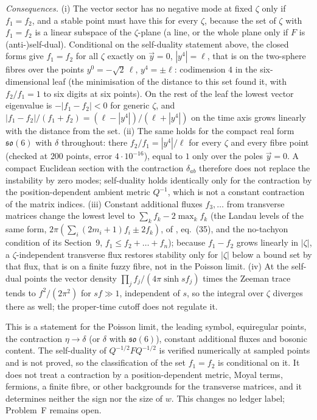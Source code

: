 \emph{Consequences.} (i) The vector sector has no negative mode at fixed \(\zeta\) only if \(f_1=f_2\), and a stable point must have this for every \(\zeta\), because the set of \(\zeta\) with \(f_1=f_2\) is a linear subspace of the \(\zeta\)-plane (a line, or the whole plane only if \(F\) is (anti-)self-dual). Conditional on the self-duality statement above, the closed forms give \(f_1=f_2\) for all \(\zeta\) exactly on \(\vec y=0\), \(|y^4|=\ell\), that is on the two-sphere fibres over the points \(y^0=-\sqrt2\,\ell\), \(y^4=\pm\ell\): codimension \(4\) in the six-dimensional leaf (the minimisation of the distance to this set found it, with \(f_2/f_1=1\) to six digits at six points). On the rest of the leaf the lowest vector eigenvalue is \(-|f_1-f_2|<0\) for generic \(\zeta\), and \(|f_1-f_2|/(f_1+f_2)=(\ell-|y^4|)/(\ell+|y^4|)\) on the time axis grows linearly with the distance from the set. (ii) The same holds for the compact real form \(\mathfrak{so}(6)\) with \(\delta\) throughout: there \(f_2/f_1=|y^4|/\ell\) for every \(\zeta\) and every fibre point (checked at \(200\) points, error \(4\cdot10^{-16}\)), equal to \(1\) only over the poles \(\vec y=0\). A compact Euclidean section with the contraction \(\delta_{ab}\) therefore does not replace the instability by zero modes; self-duality holds identically only for the contraction by the position-dependent ambient metric \(Q^{-1}\), which is not a constant contraction of the matrix indices. (iii) Constant additional fluxes \(f_3,\dots\) from transverse matrices change the lowest level to \(\sum_kf_k-2\max_kf_k\) (the Landau levels of the same form, \(2\pi(\sum_i(2m_i+1)f_i\pm2f_k)\), of \cite{Troost2000}, eq.~(35), and the no-tachyon condition of its Section~9, \(f_1\le f_2+\dots+f_n\)); because \(f_1-f_2\) grows linearly in \(|\zeta|\), a \(\zeta\)-independent transverse flux restores stability only for \(|\zeta|\) below a bound set by that flux, that is on a finite fuzzy fibre, not in the Poisson limit. (iv) At the self-dual points the vector density \(\prod_j f_j/(4\pi\sinh sf_j)\) times the Zeeman trace tends to \(f^2/(2\pi^2)\) for \(sf\gg1\), independent of \(s\), so the integral over \(\zeta\) diverges there as well; the proper-time cutoff does not regulate it.



This is a statement for the Poisson limit, the leading symbol, equiregular points, the contraction \(\eta\to\delta\) (or \(\delta\) with \(\mathfrak{so}(6)\)), constant additional fluxes and bosonic content. The self-duality of \(Q^{-1/2}FQ^{-1/2}\) is verified numerically at sampled points and is not proved, so the classification of the set \(f_1=f_2\) is conditional on it. It does not treat a contraction by a position-dependent metric, Moyal terms, fermions, a finite fibre, or other backgrounds for the transverse matrices, and it determines neither the sign nor the size of \(w\). This changes no ledger label; Problem~F remains open.



